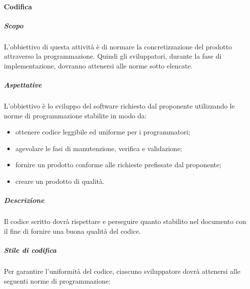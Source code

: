 			\paragraph{Codifica}
				\subparagraph{Scopo}
					L'obbiettivo di questa attività è di normare la concretizzazione del prodotto attraverso la programmazione. Quindi gli sviluppatori, durante la fase di implementazione, dovranno attenersi alle norme sotto elencate.
				\subparagraph{Aspettative}
					 L'obbiettivo è lo sviluppo del software richiesto dal proponente utilizzando le norme di programmazione stabilite in modo da:
					 	\begin{itemize}
					 	\item ottenere codice leggibile ed uniforme per i programmatori;
						\item agevolare le fasi di manutenzione, verifica e validazione;
						\item fornire un prodotto conforme alle richieste prefissate dal proponente;
						\item creare un prodotto di qualità.
					 \end{itemize}
				 \subparagraph{Descrizione}
				 	Il codice scritto dovrà rispettare e perseguire quanto stabilito nel documento  con il fine di fornire una buona qualità del codice.
				 \subparagraph{Stile di codifica}
				 	Per garantire l'uniformità del codice, ciascuno sviluppatore dovrà attenersi alle seguenti norme di programmazione:
